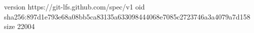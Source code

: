version https://git-lfs.github.com/spec/v1
oid sha256:897d1e793e68a08bb5ca83135a633098444068e7085c2723746a3a4079a7d158
size 22004
